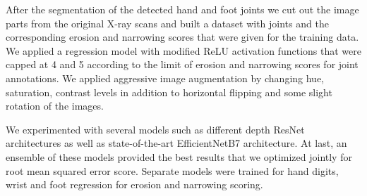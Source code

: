 \documentclass[a4paper,12pt]{article}
\begin{document}
\vspace{4mm}

\par After the segmentation of the detected hand and foot joints we cut out the image parts from the original X-ray scans and built a dataset with joints and the corresponding erosion and narrowing scores that were given for the training data. We applied a regression model with modified ReLU activation functions that were capped at 4 and 5 according to the limit of erosion and narrowing scores for joint annotations. We applied aggressive image augmentation by changing hue, saturation, contrast levels in addition to horizontal flipping and some slight rotation of the images.

\vspace{4mm}

\par We experimented with several models such as different depth ResNet \cite{he2016deep} architectures as well as state-of-the-art EfficientNetB7 \cite{tan2019efficientnet} architecture. At last, an ensemble of these models provided the best results that we optimized jointly for root mean squared error score. Separate models were trained for hand digits, wrist and foot regression for erosion and narrowing scoring.

\newpage



\end{document}
